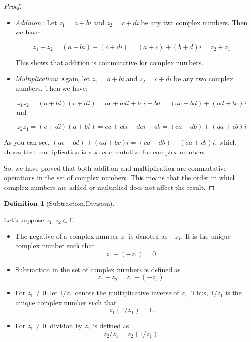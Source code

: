\documentclass[
]{book}
\providecommand{\tightlist}{%
  \setlength{\itemsep}{0pt}\setlength{\parskip}{0pt}}
\theoremstyle{definition}
\newtheorem{definition}{Definition}[chapter]
\theoremstyle{definition}
\theoremstyle{definition}
\theoremstyle{definition}
\theoremstyle{remark}
\begin{document}
\begin{proof}
\leavevmode

\begin{itemize}
\item
  \emph{Addition} : Let \(z_1 = a + bi\) and \(z_2 = c + di\) be any two complex numbers. Then we have:

  \[z_1 + z_2 = (a + bi) + (c + di) = (a + c) + (b + d)i = z_2 + z_1\]

  This shows that addition is commutative for complex numbers.
\item
  \emph{Multiplication}: Again, let \(z_1 = a + bi\) and \(z_2 = c + di\) be any two complex numbers. Then we have:

  \[z_1z_2 = (a + bi)(c + di) = ac + adi + bci - bd = (ac - bd) + (ad + bc)i\]
  and

  \[z_2z_1 = (c + di)(a + bi) = ca + cbi + dai - db = (ca - db) + (da + cb)i\]
\end{itemize}

As you can see, \((ac - bd) + (ad + bc)i = (ca - db) + (da + cb)i\), which shows that multiplication is also commutative for complex numbers.

So, we have proved that both addition and multiplication are commutative operations in the set of complex numbers. This means that the order in which complex numbers are added or multiplied does not affect the result.

\end{proof}

\begin{definition}[Subtraction,Division]
\protect\hypertarget{def:unnamed-chunk-5}{}\label{def:unnamed-chunk-5}

Let's suppose \(z_1, z_2 \in \mathbb{C}\).

\begin{itemize}
\tightlist
\item
  The negative of a complex number \(z_1\) is denoted as \(-z_1\). It is the unique complex number such that \[z_1 + (-z_1) = 0.\]
\item
  Subtraction in the set of complex numbers is defined as \[z_1 - z_2 = z_1 + (-z_2).\]
\item
  For \(z_1 \neq 0\), let \(1/z_1\) denote the multiplicative inverse of \(z_1\). Thus, \(1/z_1\) is the unique complex number such that \[z_1(1/z_1) = 1.\]
\item
  For \(z_1 \neq 0\), division by \(z_1\) is defined as \[z_2/z_1 = z_2(1/z_1).\]
\end{itemize}

\end{definition}
\end{document}

